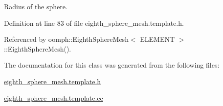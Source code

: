 Radius of the sphere. 



Definition at line 83 of file eighth\+\_\+sphere\+\_\+mesh.\+template.\+h.



Referenced by oomph\+::\+Eighth\+Sphere\+Mesh$<$ E\+L\+E\+M\+E\+N\+T $>$\+::\+Eighth\+Sphere\+Mesh().



The documentation for this class was generated from the following files\+:\begin{DoxyCompactItemize}
\item 
\hyperlink{eighth__sphere__mesh_8template_8h}{eighth\+\_\+sphere\+\_\+mesh.\+template.\+h}\item 
\hyperlink{eighth__sphere__mesh_8template_8cc}{eighth\+\_\+sphere\+\_\+mesh.\+template.\+cc}\end{DoxyCompactItemize}
